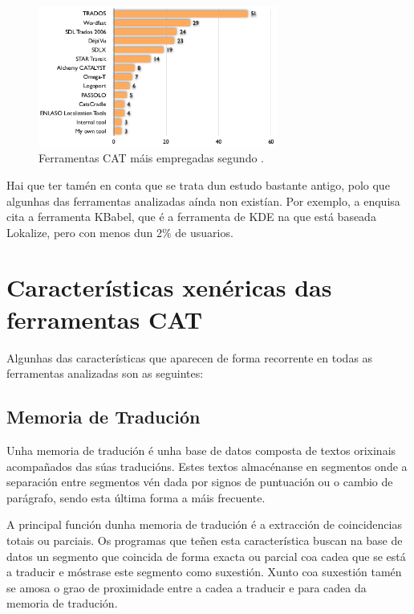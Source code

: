 \begin{figure}[h]
    \centering
    \includegraphics[width=0.7\textwidth]{img/grafico_uso_cat_enquisa2006.png}
    \caption{Ferramentas CAT máis empregadas segundo \cite{article:2006survey}.}
    \label{fig:enquisa2006}
\end{figure}

Hai que ter tamén en conta que se trata dun estudo bastante antigo, polo que algunhas das ferramentas analizadas aínda non existían. Por exemplo, a enquisa cita a ferramenta KBabel, que é a ferramenta de KDE na que está baseada Lokalize, pero con menos dun 2\% de usuarios.


\section{Características xenéricas das ferramentas CAT}

Algunhas das características que aparecen de forma recorrente en todas as ferramentas analizadas son as seguintes:

\subsection{Memoria de Tradución}
Unha memoria de tradución é unha base de datos composta de textos orixinais acompañados das súas traducións. Estes textos almacénanse en segmentos onde a separación entre segmentos vén dada por signos de puntuación ou o cambio de parágrafo, sendo esta última forma a máis frecuente.

A principal función dunha memoria de tradución é a extracción de coincidencias totais ou parciais. Os programas que teñen esta característica buscan na base de datos un segmento que coincida de forma exacta ou parcial coa cadea que se está a traducir e móstrase este segmento como suxestión. Xunto coa suxestión tamén se amosa o grao de proximidade entre a cadea a traducir e para cadea da memoria de tradución.

